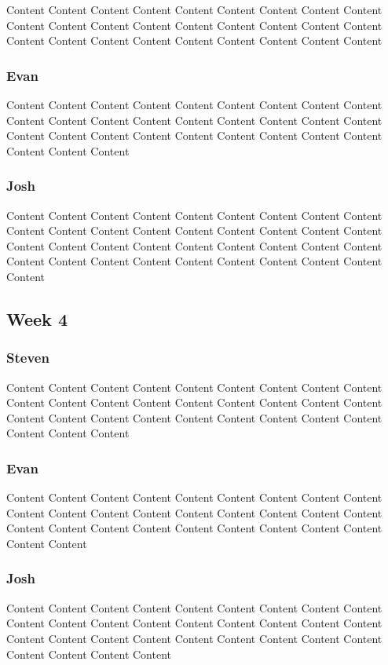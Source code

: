 \documentclass[onecolumn, draftclsnofoot,10pt, compsoc]{IEEEtran}
\begin{document}
Content Content Content Content Content Content Content Content Content Content Content Content Content Content Content Content Content Content Content Content Content Content Content Content Content Content Content 

\subsubsection{Evan}

Content Content Content Content Content Content Content Content Content Content Content Content Content Content Content Content Content Content Content Content Content Content Content Content Content Content Content Content Content Content 

\subsubsection{Josh}

Content Content Content Content Content Content Content Content Content Content Content Content Content Content Content Content Content Content Content Content Content Content Content Content Content Content Content Content Content Content Content Content Content Content Content Content Content 

\subsection{Week 4}
\subsubsection{Steven}

Content Content Content Content Content Content Content Content Content Content Content Content Content Content Content Content Content Content Content Content Content Content Content Content Content Content Content Content Content Content 

\subsubsection{Evan}

Content Content Content Content Content Content Content Content Content Content Content Content Content Content Content Content Content Content Content Content Content Content Content Content Content Content Content Content Content 

\subsubsection{Josh}

Content Content Content Content Content Content Content Content Content Content Content Content Content Content Content Content Content Content Content Content Content Content Content Content Content Content Content Content Content Content Content 
\end{document}
